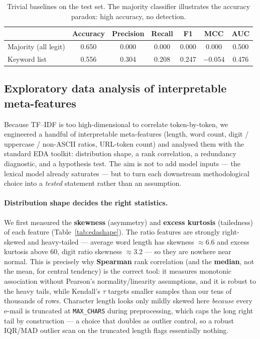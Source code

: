 \documentclass[11pt]{article}
\begin{document}
\begin{table}[t]
\centering
\caption{Trivial baselines on the test set. The majority classifier illustrates the
accuracy paradox: high accuracy, no detection.}
\label{tab:baselines}
\begin{tabular}{lcccccc}
\toprule
 & Accuracy & Precision & Recall & F1 & MCC & AUC \\
\midrule
Majority (all legit) & 0.650 & 0.000 & 0.000 & 0.000 & 0.000 & 0.500 \\
Keyword list         & 0.556 & 0.304 & 0.208 & 0.247 & $-0.054$ & 0.476 \\
\bottomrule
\end{tabular}
\end{table}

\subsection{Exploratory data analysis of interpretable meta-features}
\label{sec:corr}
Because TF--IDF is too high-dimensional to correlate token-by-token, we engineered a
handful of interpretable meta-features (length, word count, digit / uppercase /
non-ASCII ratios, URL-token count) and analysed them with the standard EDA toolkit:
distribution shape, a rank correlation, a redundancy diagnostic, and a hypothesis test.
The aim is not to add model inputs --- the lexical model already saturates --- but to turn
each downstream methodological choice into a \emph{tested} statement rather than an
assumption.

\paragraph{Distribution shape decides the right statistics.} We first measured the
\textbf{skewness} (asymmetry) and \textbf{excess kurtosis} (tailedness) of each feature
(Table~\ref{tab:edashape}). The ratio features are strongly right-skewed and heavy-tailed
--- average word length has skewness $\approx 6.6$ and excess kurtosis above $60$, digit
ratio skewness $\approx 3.2$ --- so they are nowhere near normal. This is precisely why
\textbf{Spearman} rank correlation (and the \textbf{median}, not the mean, for central
tendency) is the correct tool: it measures monotonic association without Pearson's
normality/linearity assumptions, and it is robust to the heavy tails, while Kendall's
$\tau$ targets smaller samples than our tens of thousands of rows. Character length looks
only mildly skewed here \emph{because} every e-mail is truncated at \texttt{MAX\_CHARS}
during preprocessing, which caps the long right tail by construction --- a choice that
doubles as outlier control, so a robust IQR/MAD outlier scan on the truncated length flags
essentially nothing.
\end{document}
